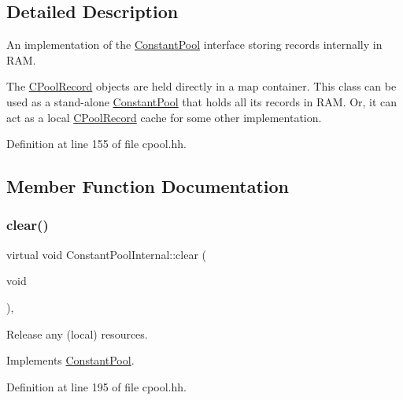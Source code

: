 \subsection{Detailed Description}
An implementation of the \mbox{\hyperlink{class_constant_pool}{Constant\+Pool}} interface storing records internally in R\+AM. 

The \mbox{\hyperlink{class_c_pool_record}{C\+Pool\+Record}} objects are held directly in a map container. This class can be used as a stand-\/alone \mbox{\hyperlink{class_constant_pool}{Constant\+Pool}} that holds all its records in R\+AM. Or, it can act as a local \mbox{\hyperlink{class_c_pool_record}{C\+Pool\+Record}} cache for some other implementation. 

Definition at line 155 of file cpool.\+hh.



\subsection{Member Function Documentation}
\mbox{\label{class_constant_pool_internal_a72e240485b635c1e82282d1ae0cbd7d5}} 
\subsubsection{\texorpdfstring{clear()}{clear()}}
{\footnotesize\ttfamily virtual void Constant\+Pool\+Internal\+::clear (\begin{DoxyParamCaption}\item[{void}]{ }\end{DoxyParamCaption})\hspace{0.3cm}{\ttfamily [inline]}, {\ttfamily [virtual]}}



Release any (local) resources. 



Implements \mbox{\hyperlink{class_constant_pool_a3cb5e39704c4dacbe8782742c2f218c4}{Constant\+Pool}}.



Definition at line 195 of file cpool.\+hh.

